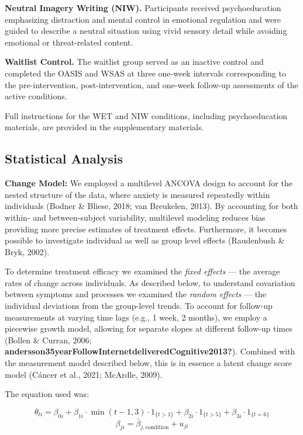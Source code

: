 \documentclass[
  man,floatsintext]{apa7}
\begin{document}
\textbf{Neutral Imagery Writing (NIW).}
Participants received psychoeducation emphasizing distraction and mental control in emotional regulation and were guided to describe a neutral situation using vivid sensory detail while avoiding emotional or threat-related content.

\textbf{Waitlist Control.}
The waitlist group served as an inactive control and completed the OASIS and WSAS at three one-week intervals corresponding to the pre-intervention, post-intervention, and one-week follow-up assessments of the active conditions.

Full instructions for the WET and NIW conditions, including psychoeducation materials, are provided in the supplementary materials.

\subsection{Statistical Analysis}\label{statistical-analysis}

\textbf{Change Model:} We employed a multilevel ANCOVA design to account for the nested structure of the data, where anxiety is measured repeatedly within individuals (Bodner \& Bliese, 2018; van Breukelen, 2013).
By accounting for both within- and between-subject variability, multilevel modeling reduces bias providing more precise estimates of treatment effects.
Furthermore, it becomes possible to investigate individual as well as group level effects (Raudenbush \& Bryk, 2002).

To determine treatment efficacy we examined the \emph{fixed effects} --- the average rates of change across individuals.
As described below, to understand covariation between symptoms and processes we examined the \emph{random effects} --- the individual deviations from the group-level trends.
To account for follow-up measurements at varying time lags (e.g., 1 week, 2 months), we employ a piecewise growth model, allowing for separate slopes at different follow-up times (Bollen \& Curran, 2006; \textbf{andersson35yearFollowInternetdeliveredCognitive2013?}).
Combined with the measurement model described below, this is in essence a latent change score model (Cáncer et al., 2021; McArdle, 2009).

The equation used was:

\[\theta_{ti} = \beta_{0i} + \beta_{1i} \cdot \min(t-1, 3) \cdot 1_{\{t > 1\}} + \beta_{2i} \cdot 1_{\{t > 5\}} + \beta_{3i} \cdot 1_{\{t=6\}}\]
\[\beta_{ji} = \bar{\beta}_{j,\text{condition}} + u_{ji}\]
\end{document}
